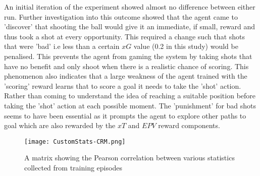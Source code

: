 \documentclass[11pt]{article}
\begin{document}
An initial iteration of the experiment showed almost no difference between either run. Further investigation into this outcome showed that the agent came to 'discover' that shooting the ball would give it an immediate, if small, reward and thus took a shot at every opportunity. This required a change such that shots that were 'bad' i.e less than a certain $xG$ value (0.2 in this study) would be penalised. This prevents the agent from gaming the system by taking shots that have no benefit and only shoot when there is a realistic chance of scoring. This phenomenon also indicates that a large weakness of the agent trained with the 'scoring' reward learns that to score a goal it needs to take the 'shot' action. Rather than coming to understand the idea of reaching a suitable position before taking the 'shot' action at each possible moment. The 'punishment' for bad shots seems to have been essential as it prompts the agent to explore other paths to goal which are also rewarded by the $xT$ and $EPV$ reward components.

\begin{figure}[!h]
    \centering
    \hspace*{-2cm}
    \texttt{[image: CustomStats-CRM.png]}
    \caption{A matrix showing the Pearson correlation between various statistics collected from training episodes}
    \label{fig:CRM-Custom}
\end{figure}

\pagebreak


\end{document}
